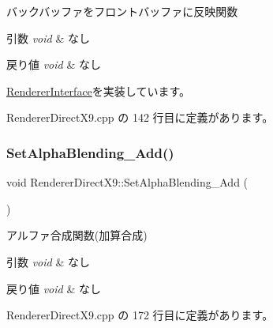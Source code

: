 バックバッファをフロントバッファに反映関数 


\begin{DoxyParams}{引数}
{\em void} & なし \\
\hline
\end{DoxyParams}

\begin{DoxyRetVals}{戻り値}
{\em void} & なし \\
\hline
\end{DoxyRetVals}


\mbox{\hyperlink{class_renderer_interface_aa9e12d2a2f5ffa351c457cfc7806b6f1}{Renderer\+Interface}}を実装しています。



 Renderer\+Direct\+X9.\+cpp の 142 行目に定義があります。

\mbox{\label{class_renderer_direct_x9_aa552107a3d5f8a61347fe10741fd04a3}} 
\subsubsection{\texorpdfstring{Set\+Alpha\+Blending\+\_\+\+Add()}{SetAlphaBlending\_Add()}}
{\footnotesize\ttfamily void Renderer\+Direct\+X9\+::\+Set\+Alpha\+Blending\+\_\+\+Add (\begin{DoxyParamCaption}{ }\end{DoxyParamCaption})}



アルファ合成関数(加算合成) 


\begin{DoxyParams}{引数}
{\em void} & なし \\
\hline
\end{DoxyParams}

\begin{DoxyRetVals}{戻り値}
{\em void} & なし \\
\hline
\end{DoxyRetVals}


 Renderer\+Direct\+X9.\+cpp の 172 行目に定義があります。

\mbox{\label{class_renderer_direct_x9_a083f55d941075227189769fd9807ffd1}} 
